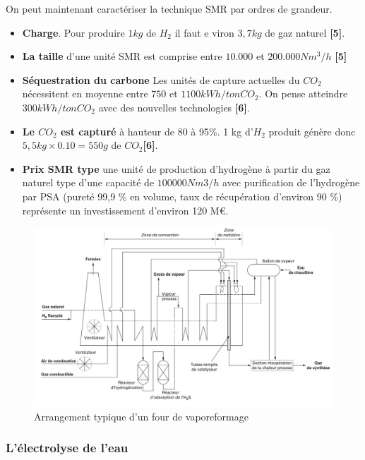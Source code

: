 \documentclass[11pt,french,a4paper]{article}
\begin{document}
On peut maintenant caractériser la technique SMR par ordres de grandeur.
\begin{itemize}
\item \textbf{Charge}. Pour produire $1kg$ de $H_2$ il faut e viron $3,7kg$ de gaz naturel \textbf{[5]}.
\item \textbf{La taille} d'une unité SMR est comprise entre $10.000$ et $200.000 Nm^3/h$ \textbf{[5]}
\item \textbf{Séquestration du carbone} Les unités de capture actuelles du $CO_2$ nécessitent en moyenne entre $750$ et $1100kWh/ton CO_2$. On pense atteindre $300kWh/ton CO_2$ avec des nouvelles technologies \textbf{[6]}.
\item \textbf{Le $CO_2$ est capturé} à hauteur de 80 à 95\%. 1 kg d'$H_2$ produit génère donc $ 5,5 kg \times 0.10 = 550 g$ de $CO_2$\textbf{[6]}.
\item \textbf{Prix SMR type} une unité de production d’hydrogène à partir du gaz naturel type d’une capacité de $100 000 Nm3/h$ avec purification de l’hydrogène par PSA (pureté 99,9 \% en volume, taux de récupération d’environ 90 \%) représente un investissement d’environ 120 M€.
\end{itemize}

\begin{center}
\begin{figure}[!h]
\includegraphics[width=.9\linewidth]{image/chap3/Arrangement_four_vaporeformage.jpg}
\caption{Arrangement typique d'un four de vaporeformage \cite{Prod_gaz_synth}}
\label{fig:arrangement_four}
\end{figure}
\end{center}

\subsubsection{L'électrolyse de l'eau}
\end{document}
